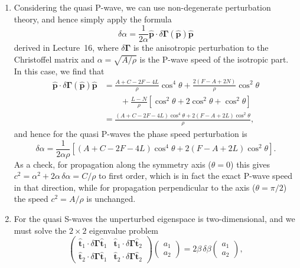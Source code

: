 \documentclass[a4paper,10pt]{paper}
\begin{document}
\begin{enumerate}
\begin{enumerate}
\item Considering the quasi P-wave, we can use non-degenerate perturbation theory, and hence simply apply the formula
\begin{equation*}
    \delta\alpha=\frac{1}{2\alpha}\hat{\mathbf{p}}\cdot\delta\bm{\Gamma}(\hat{\mathbf{p}})\hat{\mathbf{p}}
\end{equation*}
derived in Lecture~16, where $\delta\bm{\Gamma}$ is the anisotropic perturbation to the Christoffel matrix and $\alpha=\sqrt{A/\rho}$ is the P-wave speed of the isotropic part. In this case, we find that
\begin{align*}
    \hat{\mathbf{p}}\cdot\delta\bm{\Gamma}(\hat{\mathbf{p}})\hat{\mathbf{p}}&=\frac{A+C-2F-4L}{\rho}\cos^{4}\theta+\frac{2(F-A+2N)}{\rho}\cos^{2}\theta \\
    &\qquad+\frac{L-N}{\rho}[\cos^{2}\theta+2\cos^{2}\theta+\cos^{2}\theta] \\
    &= \frac{(A+C-2F-4L)\cos^{4}\theta+2(F-A+2L)\cos^{2}\theta}{\rho},
\end{align*}
and hence for the quasi P-waves the phase speed perturbation is
\begin{equation*}
    \delta\alpha=\frac{1}{2\alpha\rho}\left[(A+C-2F-4L)\cos^{4}\theta+2(F-A+2L)\cos^{2}\theta\right].
\end{equation*}
As a check, for propagation along the symmetry axis ($\theta=0$) this gives $c^{2}=\alpha^{2}+2\alpha\,\delta\alpha=C/\rho$ to first order, which is in fact the exact P-wave speed in that direction, while for propagation perpendicular to the axis ($\theta=\pi/2$) the speed $c^{2}=A/\rho$ is unchanged.
\item For the quasi S-waves the unperturbed eigenspace is two-dimensional, and we must solve the $2\times2$ eigenvalue problem
\begin{equation*}
    \begin{pmatrix} \hat{\mathbf{t}}_{1}\cdot\delta\bm{\Gamma}\hat{\mathbf{t}}_{1} & \hat{\mathbf{t}}_{1}\cdot\delta\bm{\Gamma}\hat{\mathbf{t}}_{2} \\ \hat{\mathbf{t}}_{2}\cdot\delta\bm{\Gamma}\hat{\mathbf{t}}_{1} & \hat{\mathbf{t}}_{2}\cdot\delta\bm{\Gamma}\hat{\mathbf{t}}_{2}\end{pmatrix}\begin{pmatrix} a_{1} \\ a_{2}\end{pmatrix} = 2\beta\,\delta\beta\begin{pmatrix} a_{1} \\ a_{2}\end{pmatrix},

\end{equation*}
\end{enumerate}
\end{enumerate}
\end{document}
